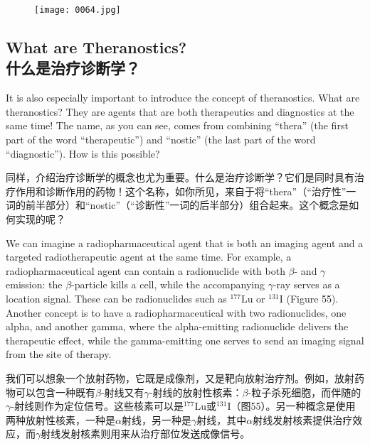 \documentclass[dvipsnames, svgnames,a4paper,11pt]{article}
\begin{document}
\begin{figure}[ht]
    \centering
    \texttt{[image: 0064.jpg]}
     \label{fig54}
\end{figure}


\subsection{What are Theranostics?\\什么是治疗诊断学？}

It is also especially important to introduce the concept of theranostics. What are theranostics? They are agents that are both therapeutics and diagnostics at the same time! The name, as you can see, comes from combining “thera” (the first part of the word “therapeutic”) and “nostic” (the last part of the word “diagnostic”). How is this possible?

同样，介绍治疗诊断学的概念也尤为重要。什么是治疗诊断学？它们是同时具有治疗作用和诊断作用的药物！这个名称，如你所见，来自于将“thera”（“治疗性”一词的前半部分）和“nostic”（“诊断性”一词的后半部分）组合起来。这个概念是如何实现的呢？

We can imagine a radiopharmaceutical agent that is both an imaging agent and a targeted radiotherapeutic agent at the same time. For example, a radiopharmaceutical agent can contain a radionuclide with both \(\beta\)- and \(\gamma\) emission: the \(\beta\)-particle kills a cell, while the accompanying \(\gamma\)-ray serves as a location signal. These can be radionuclides such as \(\mathrm{^{177}Lu}\) or \(\mathrm{^{131}I}\) (Figure 55). Another concept is to have a radiopharmaceutical with two radionuclides, one alpha, and another gamma, where the alpha-emitting radionuclide delivers the therapeutic effect, while the gamma-emitting one serves to send an imaging signal from the site of therapy.


我们可以想象一个放射药物，它既是成像剂，又是靶向放射治疗剂。例如，放射药物可以包含一种既有\(\beta\)-射线又有\(\gamma\)-射线的放射性核素：\(\beta\)-粒子杀死细胞，而伴随的\(\gamma\)-射线则作为定位信号。这些核素可以是\(\mathrm{^{177}Lu}\)或\(\mathrm{^{131}I}\)（图55）。另一种概念是使用两种放射性核素，一种是$\alpha$射线，另一种是$\gamma$射线，其中$\alpha$射线发射核素提供治疗效应，而$\gamma$射线发射核素则用来从治疗部位发送成像信号。
\end{document}
